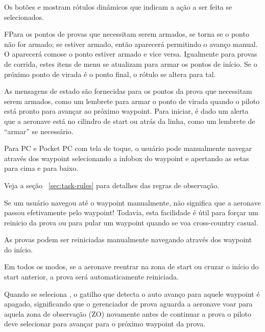 Os botões  e
 mostram rótulos dinâmicos que indicam a ação a ser feita se selecionados.

FPara os pontos de provas que necessitam serem armados,  se torna 
 se o ponto não for armado;  se estiver armado, então aparecerá
 permitindo o avanço manual.  O
 aparecerá comose o ponto estiver armado e vice versa.  Igualmente para provas de corrida, estes itens de menu se atualizam para armar os pontos de início.  Se o próximo ponto de virada é o ponto final, o rótulo se altera para tal.

As mensagens de estado são fornecidas para os pontos da prova que necessitam serem armados, como um lembrete para armar o ponto de virada quando o piloto está pronto para avançar ao próximo waypoint.  Para iniciar, é dado um alerta que a aeronave está no cilindro de start ou atrás da linha, como um lembrete de “armar” se necessário.  

Para PC e Pocket PC com tela de toque, o usuário pode manualmente navegar através dos waypoint selecionando a infobox do waypoint e apertando as setas para cima e para baixo.

Veja a seção ~\ref{sec:task-rules} para detalhes das regras de observação.

Se um usuário navegou até o waypoint manualmente, não significa que a aeronave passou efetivamente pelo waypoint!  Todavia, esta facilidade é útil para forçar um reinicio da prova ou para pular um waypoint quando se voa cross-country casual.

\tip As provas podem ser reiniciadas manualmente navegando através dos waypoint do início.

Em todos os modos, se a aeronave reentrar na zona de start ou cruzar o início do start anterior, a prova será automaticamente reiniciada.

Quando se seleciona  , o gatilho que detecta o auto avanço para aquele waypoint é apagado, significando que o gerenciador de prova aguarda a aeronave voar para aquela zona de observação (ZO) novamente antes de continuar a prova o piloto deve selecionar  para avançar para o próximo waypoint da prova.

